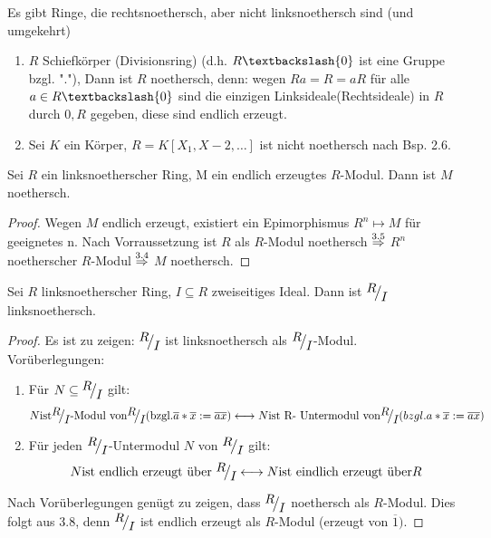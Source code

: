 \begin{anm}
	Es gibt Ringe, die rechtsnoethersch, aber nicht linksnoethersch sind (und umgekehrt)
\end{anm}
\begin{bsp}
	\begin{enumerate} [label=\alph*)]
		\item $R$ Schiefkörper (Divisionsring) (d.h. $R \textbackslash \{0\}$ ist eine Gruppe bzgl. "."), Dann ist $R$ noethersch, denn: wegen $Ra=R=aR$ für alle $ a \in R \textbackslash \{0\}$ sind die einzigen Linksideale(Rechtsideale) in $R$ durch $0,R$ gegeben, diese sind endlich erzeugt.
		\item Sei $K$ ein Körper, $ R= K [ X_1,X-2,\dots ]$ ist nicht noethersch nach Bsp. 2.6.
	\end{enumerate}
\end{bsp}
\begin{bem}
	Sei $R$ ein linksnoetherscher Ring, M ein endlich erzeugtes $R$-Modul. Dann ist $M$ noethersch. 
\end{bem}
\begin{proof}
	Wegen $M$ endlich erzeugt, existiert ein Epimorphismus $R^n \mapsto M $ für geeignetes n. Nach Vorraussetzung ist $R$ als $R$-Modul noethersch $\overset{3.5}{\Rightarrow} $ $R^n $ noetherscher $R$-Modul $\overset{3.4}{\Rightarrow}$ $M$ noethersch.
\end{proof}
\begin{bem}
	Sei $R$ linksnoetherscher Ring, $I \subseteq R $ zweiseitiges Ideal. Dann ist $\QR{R}{I} $ linksnoethersch.
\end{bem}
\begin{proof}
	Es ist zu zeigen: $\QR{R}{I} $ ist linksnoethersch als $\QR{R}{I} $-Modul. \\
	Vorüberlegungen:
	\begin{enumerate} [label= \roman*)]
		\item Für $N \subseteq \QR{R}{I}$ gilt: $$ N \text{ist} \QR{R}{I} \text{-Modul von} \QR{R}{I} (\text{bzgl.}\overline{a}*\overline{x} := \overline{ax}) \longleftrightarrow N \text{ist R- Untermodul von} \QR{R}{I} (bzgl. a*\overline{x} := \overline{ax}) $$
		\item Für jeden $\QR{R}{I} $-Untermodul $N$ von $\QR{R}{I} $ gilt:
		$$ N \text{ist endlich erzeugt über } \QR{R}{I} \longleftrightarrow N \text{ist eindlich erzeugt über} R $$ 
	\end{enumerate}
	Nach Vorüberlegungen genügt zu zeigen, dass $\QR{R}{I}$ noethersch als $R$-Modul. Dies folgt aus 3.8, denn $\QR{R}{I}$ ist endlich erzeugt als $R$-Modul (erzeugt von $\overline{1}).$
\end{proof}
